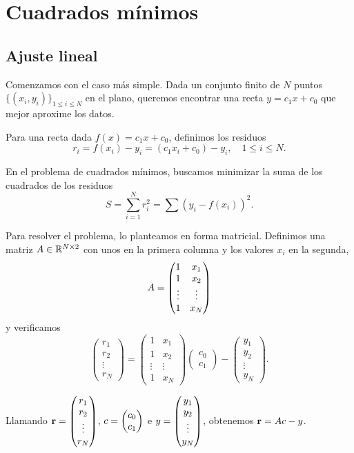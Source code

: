 \chapter{Cuadrados mínimos}

\section{Ajuste lineal}
Comenzamos con el caso más simple. Dada un conjunto finito de $N$ puntos $\{(x_i, y_i)\}_{1 \le i \le N}$ en el plano, queremos encontrar una recta $y = c_1 x + c_0$ que mejor aproxime los datos.

Para una recta dada $f(x) = c_1 x + c_0$, definimos los residuos
$$
r_i = f(x_i) - y_i = (c_1 x_i + c_0) - y_i, \quad 1 \le i \le N.
$$

En el problema de cuadrados mínimos, buscamos minimizar la suma de los cuadrados de los residuos
$$
S = \sum_{i = 1}^N r_i^2 = \sum (y_i - f(x_i))^2.
$$

Para resolver el problema, lo planteamos en forma matricial. Definimos una matriz $\Ab \in \R^{N \times 2}$ con unos en la primera columna y los valores $x_i$ en la segunda,
$$
\Ab = \begin{pmatrix}
1 & x_1 \\
1 & x_2 \\
\vdots & \vdots \\
1 & x_N
\end{pmatrix}
$$
y verificamos
$$
\begin{pmatrix}
r_1 \\
r_2 \\
\vdots \\
r_N
\end{pmatrix} =
\begin{pmatrix}
1 & x_1 \\
1 & x_2 \\
\vdots & \vdots \\
1 & x_N
\end{pmatrix}
\begin{pmatrix}
c_0 \\
c_1
\end{pmatrix}
- \begin{pmatrix}
y_1 \\
y_2 \\
\vdots \\
y_N
\end{pmatrix}.
$$

Llamando $\mathbf{r} = \begin{pmatrix}
r_1 \\
r_2 \\
\vdots \\
r_N
\end{pmatrix}$,
$\cb = \begin{pmatrix}
c_0 \\
c_1
\end{pmatrix}$ e  $\yb = \begin{pmatrix}
y_1 \\
y_2 \\
\vdots \\
y_N
\end{pmatrix}$, obtenemos $\rb = \Ab \cb - \yb$.

